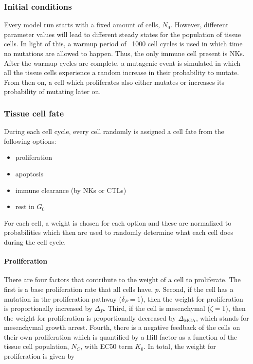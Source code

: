 \documentclass[11pt]{article}
\begin{document}
\subsubsection{Initial conditions} Every model run starts with a fixed amount of cells, $N_0$.
However, different parameter values will lead to different steady states for the population of tissue cells.
In light of this, a warmup period of ~1000 cell cycles is used in which time no mutations are allowed to happen.
Thus, the only immune cell present is NKs.
After the warmup cycles are complete, a mutagenic event is simulated in which all the tissue cells experience a random increase in their probability to mutate.
From then on, a cell which proliferates also either mutates or increases its probability of mutating later on.

\subsubsection{Tissue cell fate}
During each cell cycle, every cell randomly is assigned a cell fate from the following options:
\begin{itemize}
\item proliferation
\item apoptosis
\item immune clearance (by NKs or CTLs)
\item rest in $G_0$
\end{itemize}

For each cell, a weight is chosen for each option and these are normalized to probabilities which then are used to randomly determine what each cell does during the cell cycle.

\paragraph{Proliferation}
There are four factors that contribute to the weight of a cell to proliferate.
The first is a base proliferation rate that all cells have, $p$.
Second, if the cell has a mutation in the proliferation pathway ($\delta_P=1$), then the weight for proliferation is proportionally increased by $\Delta_P$.
Third, if the cell is mesenchymal ($\zeta=1$), then the weight for proliferation is proportionally decreased by $\Delta_{\text{MGA}}$, which stands for mesenchymal growth arrest.
Fourth, there is a negative feedback of the cells on their own proliferation which is quantified by a Hill factor as a function of the tissue cell population, $N_C$, with EC50 term $K_0$.
In total, the weight for proliferation is given by
\end{document}
